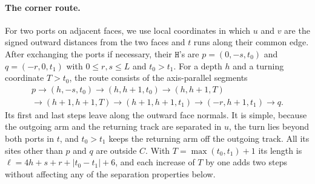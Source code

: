 \documentclass[11pt,letterpaper]{article}
\theoremstyle{definition}
\theoremstyle{remark}
\newcommand{\Hh}{\mathtt{H}}
\begin{document}
\paragraph{The corner route.}
For two ports on adjacent faces, we use local coordinates in which $u$ and $v$ are the signed
outward distances from the two faces and $t$ runs along their common edge. After exchanging the ports
if necessary, their $\Hh$'s are $p=(0,-s,t_0)$ and $q=(-r,0,t_1)$ with $0\le r,s\le L$ and $t_0>t_1$.
For a depth $h$ and a turning coordinate $T>t_0$, the route consists of the axis-parallel segments
\begin{multline}\label{eq:corner}
p\to(h,-s,t_0)\to(h,h+1,t_0)\to(h,h+1,T)\\
\to(h+1,h+1,T)\to(h+1,h+1,t_1)\to(-r,h+1,t_1)\to q.
\end{multline}
Its first and last steps leave along the outward face normals. It is simple, because the outgoing
arm and the returning track are separated in $u$, the turn lies beyond both ports in $t$, and $t_0>t_1$
keeps the returning arm off the outgoing track. All its sites other than $p$ and $q$ are outside
$C$. With $T=\max(t_0,t_1)+1$ its length is $\ell=4h+s+r+|t_0-t_1|+6$, and each increase of $T$ by one
adds two steps without affecting any of the separation properties below.
\end{document}

